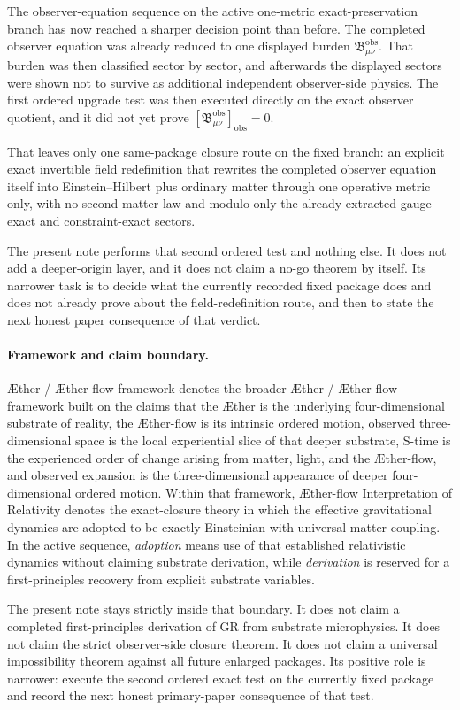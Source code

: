 \documentclass[11pt]{article}
\newcommand{\Aether}{\AE{}ther}
\newcommand{\Aflow}{\AE{}ther-flow}
\newcommand{\TheoryName}{\Aflow{} Interpretation of Relativity}
\newcommand{\TheoryProgram}{\Aether{} / \Aflow{} framework}
\newcommand{\ObsBurden}{\mathfrak B_{\mu\nu}^{\mathrm{obs}}}
\newcommand{\ObserverClass}[1]{\left[#1\right]_{\mathrm{obs}}}
\begin{document}
The observer-equation sequence on the active one-metric exact-preservation branch has now reached a sharper decision point than before. The completed observer equation was already reduced to one displayed burden \(\ObsBurden\). That burden was then classified sector by sector, and afterwards the displayed sectors were shown not to survive as additional independent observer-side physics. The first ordered upgrade test was then executed directly on the exact observer quotient, and it did not yet prove \(\ObserverClass{\ObsBurden}=0\).

That leaves only one same-package closure route on the fixed branch: an explicit exact invertible field redefinition that rewrites the completed observer equation itself into Einstein--Hilbert plus ordinary matter through one operative metric only, with no second matter law and modulo only the already-extracted gauge-exact and constraint-exact sectors.

The present note performs that second ordered test and nothing else. It does not add a deeper-origin layer, and it does not claim a no-go theorem by itself. Its narrower task is to decide what the currently recorded fixed package does and does not already prove about the field-redefinition route, and then to state the next honest paper consequence of that verdict.

\paragraph{Framework and claim boundary.}
\TheoryProgram{} denotes the broader \Aether{} / \Aflow{} framework built on the claims that the \Aether{} is the underlying four-dimensional substrate of reality, the \Aflow{} is its intrinsic ordered motion, observed three-dimensional space is the local experiential slice of that deeper substrate, S-time is the experienced order of change arising from matter, light, and the \Aflow{}, and observed expansion is the three-dimensional appearance of deeper four-dimensional ordered motion. Within that framework, \TheoryName{} denotes the exact-closure theory in which the effective gravitational dynamics are adopted to be exactly Einsteinian with universal matter coupling. In the active sequence, \emph{adoption} means use of that established relativistic dynamics without claiming substrate derivation, while \emph{derivation} is reserved for a first-principles recovery from explicit substrate variables.

The present note stays strictly inside that boundary. It does not claim a completed first-principles derivation of GR from substrate microphysics. It does not claim the strict observer-side closure theorem. It does not claim a universal impossibility theorem against all future enlarged packages. Its positive role is narrower: execute the second ordered exact test on the currently fixed package and record the next honest primary-paper consequence of that test.
\end{document}
